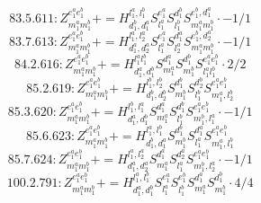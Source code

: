 \documentclass[letterpaper,10pt,fleqn,leqno,onecolumn]{article}
\begin{document}
\begin{equation} \;\;\;\;\;\;  83.5.611: Z^{e_{1}^{a}e_{1}^{b}}_{m_{1}^{a}m_{1}^{b}}+=H^{l_{1}^{a},l_{1}^{b}}_{d_{1}^{b},d_{1}^{a}}S^{e_{1}^{a}}_{l_{1}^{a}}S^{d_{1}^{b}}_{l_{1}^{b}}S^{e_{1}^{b},d_{1}^{a}}_{m_{1}^{a}m_{1}^{b}}\cdot -1/1 \end{equation}
\begin{equation} \;\;\;\;\;\;  83.7.613: Z^{e_{1}^{a}e_{1}^{b}}_{m_{1}^{a}m_{1}^{b}}+=H^{l_{1}^{a},l_{2}^{a}}_{d_{1}^{a},d_{2}^{a}}S^{e_{1}^{a}}_{l_{1}^{a}}S^{d_{1}^{a}}_{l_{2}^{a}}S^{e_{1}^{b},d_{2}^{a}}_{m_{1}^{a}m_{1}^{b}}\cdot -1/1 \end{equation}
\begin{equation} \;\;\;\;\;\;  84.2.616: Z^{e_{1}^{a}e_{1}^{b}}_{m_{1}^{a}m_{1}^{b}}+=H^{l_{1}^{a}l_{1}^{b}}_{d_{1}^{a},d_{1}^{b}}S^{d_{1}^{a}}_{m_{1}^{a}}S^{d_{1}^{b}}_{m_{1}^{b}}S^{e_{1}^{a}e_{1}^{b}}_{l_{1}^{a}l_{1}^{b}}\cdot 2/2 \end{equation}
\begin{equation} \;\;\;\;\;\;  85.2.619: Z^{e_{1}^{a}e_{1}^{b}}_{m_{1}^{a}m_{1}^{b}}+=H^{l_{1}^{b},l_{2}^{b}}_{d_{1}^{b},d_{2}^{b}}S^{d_{1}^{b}}_{m_{1}^{b}}S^{d_{2}^{b}}_{l_{1}^{b}}S^{e_{1}^{a}e_{1}^{b}}_{m_{1}^{a},l_{2}^{b}} \end{equation}
\begin{equation} \;\;\;\;\;\;  85.3.620: Z^{e_{1}^{a}e_{1}^{b}}_{m_{1}^{a}m_{1}^{b}}+=H^{l_{1}^{b},l_{1}^{a}}_{d_{1}^{a},d_{1}^{b}}S^{d_{1}^{a}}_{m_{1}^{a}}S^{d_{1}^{b}}_{l_{1}^{b}}S^{e_{1}^{a}e_{1}^{b}}_{m_{1}^{b},l_{1}^{a}}\cdot -1/1 \end{equation}
\begin{equation} \;\;\;\;\;\;  85.6.623: Z^{e_{1}^{a}e_{1}^{b}}_{m_{1}^{a}m_{1}^{b}}+=H^{l_{1}^{a},l_{1}^{b}}_{d_{1}^{b},d_{1}^{a}}S^{d_{1}^{b}}_{m_{1}^{b}}S^{d_{1}^{a}}_{l_{1}^{a}}S^{e_{1}^{a}e_{1}^{b}}_{m_{1}^{a},l_{1}^{b}} \end{equation}
\begin{equation} \;\;\;\;\;\;  85.7.624: Z^{e_{1}^{a}e_{1}^{b}}_{m_{1}^{a}m_{1}^{b}}+=H^{l_{1}^{a},l_{2}^{a}}_{d_{1}^{a},d_{2}^{a}}S^{d_{1}^{a}}_{m_{1}^{a}}S^{d_{2}^{a}}_{l_{1}^{a}}S^{e_{1}^{a}e_{1}^{b}}_{m_{1}^{b},l_{2}^{a}}\cdot -1/1 \end{equation}
\begin{equation} \;\;\;\;\;\;  100.2.791: Z^{e_{1}^{a}e_{1}^{b}}_{m_{1}^{a}m_{1}^{b}}+=H^{l_{1}^{a},l_{1}^{b}}_{d_{1}^{a},d_{1}^{b}}S^{e_{1}^{a}}_{l_{1}^{a}}S^{e_{1}^{b}}_{l_{1}^{b}}S^{d_{1}^{a}}_{m_{1}^{a}}S^{d_{1}^{b}}_{m_{1}^{b}}\cdot 4/4 \end{equation}
\end{document}
